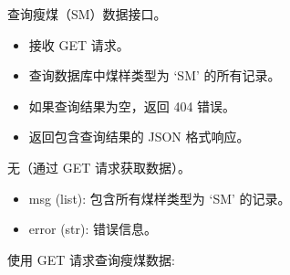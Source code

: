 \documentclass[a4paper,12pt,english]{sphinxmanual}
\begin{document}
\begin{fulllineitems}
\label{\detokenize{api/login:login.getShouCoalData}}
\pysigstartsignatures
{}
\pysigstopsignatures
\sphinxAtStartPar
查询瘦煤（SM）数据接口。
\begin{description}
\begin{itemize}
\item {} 
\sphinxAtStartPar
接收 GET 请求。

\item {} 
\sphinxAtStartPar
查询数据库中煤样类型为 ‘SM’ 的所有记录。

\item {} 
\sphinxAtStartPar
如果查询结果为空，返回 404 错误。

\item {} 
\sphinxAtStartPar
返回包含查询结果的 JSON 格式响应。

\end{itemize}

\sphinxAtStartPar
无（通过 GET 请求获取数据）。

\begin{description}
\begin{itemize}
\item {} 
\sphinxAtStartPar
msg (list): 包含所有煤样类型为 ‘SM’ 的记录。

\end{itemize}

\begin{itemize}
\item {} 
\sphinxAtStartPar
error (str): 错误信息。

\end{itemize}

\end{description}

\sphinxAtStartPar
使用 GET 请求查询瘦煤数据:

\begin{sphinxVerbatim}[commandchars=\\\{\}]
 

     \PYG{p}{[}
             
             
             
    \PYG{p}{]}


\end{sphinxVerbatim}
\end{description}
\end{fulllineitems}
\end{document}
